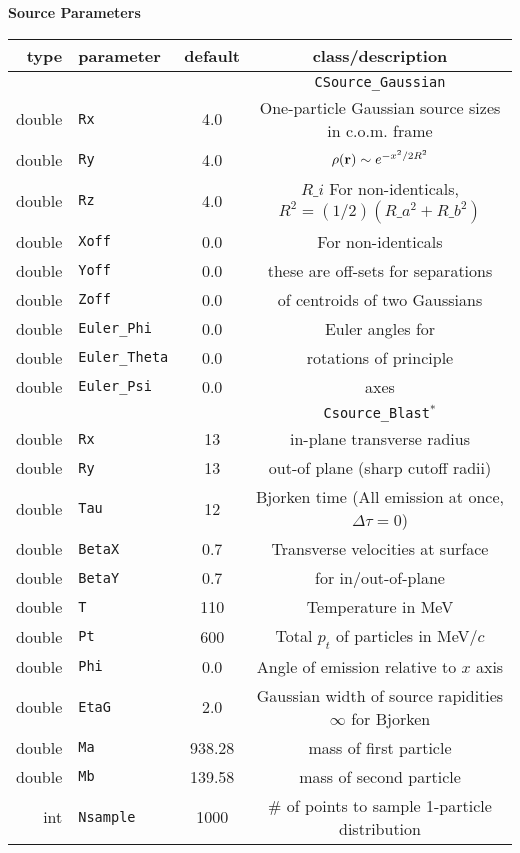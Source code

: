 \documentclass[10pt]{article}
\begin{document}
\begin{center}
{\large \bf Source Parameters}
\begin{tabular}{|r|l|c|c|} \hline
type & parameter & default & class/description \\ \hline\hline
& & & {\tt CSource\_Gaussian} \\ \hline
double & {\tt Rx} & 4.0 & One-particle Gaussian source sizes in c.o.m. frame\\
double & {\tt Ry} & 4.0 & $\rho({\bf r})\sim e^{-x^2/2R^2}$\\
double & {\tt Rz} & 4.0 & $R\_i$ For non-identicals, 
$R^2=(1/2)(R\_a^2+R\_b^2)$\\ \hline
double & {\tt Xoff} & 0.0 & For non-identicals\\
double & {\tt Yoff} & 0.0 & these are off-sets for separations \\
double & {\tt Zoff} & 0.0 & of centroids of two Gaussians\\ \hline
double & {\tt Euler\_Phi} & 0.0 & Euler angles for\\
double & {\tt Euler\_Theta} & 0.0 & rotations of principle\\
double & {\tt Euler\_Psi} & 0.0 & axes \\ \hline\hline
& & & {\tt Csource\_Blast$^*$} \\ \hline
double & {\tt Rx} & 13 & in-plane transverse radius \\
double & {\tt Ry} & 13 & out-of plane (sharp cutoff radii) \\ \hline
double & {\tt Tau} & 12 & Bjorken time (All emission at once, $\Delta\tau=0$)\\ \hline
double & {\tt BetaX} & 0.7 & Transverse velocities at surface\\
double & {\tt BetaY} & 0.7 & for in/out-of-plane\\ \hline
double & {\tt T} & 110 & Temperature in MeV \\ \hline
double & {\tt Pt} & 600 & Total $p_t$ of particles in MeV/$c$\\ \hline
double & {\tt Phi} & 0.0 & Angle of emission relative to $x$ axis\\ \hline
double & {\tt EtaG} & 2.0 & Gaussian width of source rapidities $\infty$ for Bjorken 
\\ \hline
double & {\tt Ma} & 938.28 & mass of first particle\\
double & {\tt Mb} & 139.58 & mass of second particle\\ \hline
int  & {\tt Nsample} & 1000 & \parbox{3.8in}{
\centerline{\# of points to sample 1-particle distribution}
}
\end{tabular}
\end{center}
\end{document}
